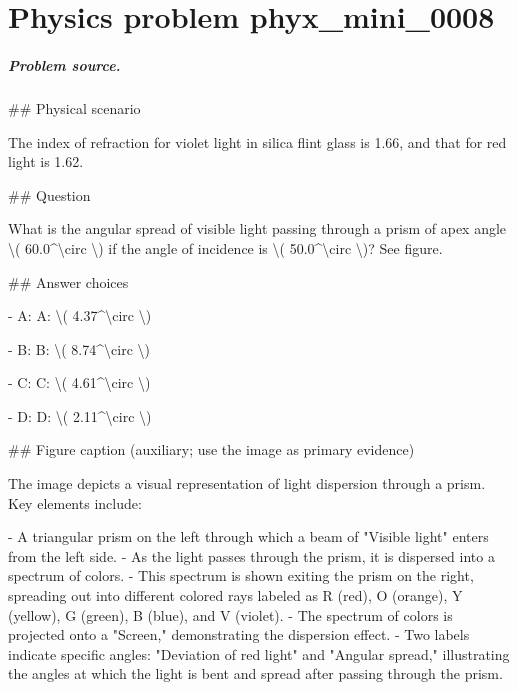 
\chapter{Physics problem phyx\_mini\_0008}
\label{ch:PhyXMiniProblems_problem_phyx_mini_0008}

\paragraph{Problem source.}
\#\# Physical scenario

The index of refraction for violet light in silica flint glass is 1.66, and that for red light is 1.62.

\#\# Question

What is the angular spread of visible light passing through a prism of apex angle \textbackslash{}( 60.0\textasciicircum{}\textbackslash{}circ \textbackslash{}) if the angle of incidence is \textbackslash{}( 50.0\textasciicircum{}\textbackslash{}circ \textbackslash{})? See figure.

\#\# Answer choices

- A: A: \textbackslash{}( 4.37\textasciicircum{}\textbackslash{}circ \textbackslash{})

- B: B: \textbackslash{}( 8.74\textasciicircum{}\textbackslash{}circ \textbackslash{})

- C: C: \textbackslash{}( 4.61\textasciicircum{}\textbackslash{}circ \textbackslash{})

- D: D: \textbackslash{}( 2.11\textasciicircum{}\textbackslash{}circ \textbackslash{})

\#\# Figure caption (auxiliary; use the image as primary evidence)

The image depicts a visual representation of light dispersion through a prism. Key elements include:

- A triangular prism on the left through which a beam of "Visible light" enters from the left side.
- As the light passes through the prism, it is dispersed into a spectrum of colors.
- This spectrum is shown exiting the prism on the right, spreading out into different colored rays labeled as R (red), O (orange), Y (yellow), G (green), B (blue), and V (violet).
- The spectrum of colors is projected onto a "Screen," demonstrating the dispersion effect.
- Two labels indicate specific angles: "Deviation of red light" and "Angular spread," illustrating the angles at which the light is bent and spread after passing through the prism.

